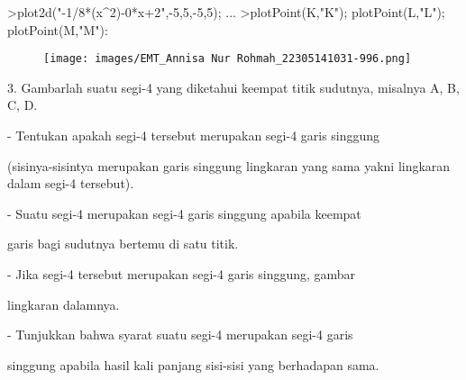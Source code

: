 \documentclass[a4paper,10pt]{article}
\begin{document}
\begin{eulernotebook}
\begin{eulercomment}
\begin{eulercomment}
\begin{eulercomment}
\begin{eulercomment}
\begin{euleroutput}
\end{euleroutput}
\begin{eulerprompt}
>plot2d("-1/8*(x^2)-0*x+2",-5,5,-5,5); ...
>plotPoint(K,"K"); plotPoint(L,"L"); plotPoint(M,"M"): 
\end{eulerprompt}
\begin{figure}[h]
    \centering
    \texttt{[image: images/EMT\_Annisa Nur Rohmah\_22305141031-996.png]}
\end{figure}
\begin{eulercomment}
3. Gambarlah suatu segi-4 yang diketahui keempat titik sudutnya,
misalnya A, B, C, D.\\
\end{eulercomment}
\begin{eulerttcomment}
   - Tentukan apakah segi-4 tersebut merupakan segi-4 garis singgung
\end{eulerttcomment}
\begin{eulercomment}
(sisinya-sisintya merupakan garis singgung lingkaran yang sama yakni
lingkaran dalam segi-4 tersebut).\\
\end{eulercomment}
\begin{eulerttcomment}
   - Suatu segi-4 merupakan segi-4 garis singgung apabila keempat
\end{eulerttcomment}
\begin{eulercomment}
garis bagi sudutnya bertemu di satu titik.\\
\end{eulercomment}
\begin{eulerttcomment}
   - Jika segi-4 tersebut merupakan segi-4 garis singgung, gambar
\end{eulerttcomment}
\begin{eulercomment}
lingkaran dalamnya.\\
\end{eulercomment}
\begin{eulerttcomment}
   - Tunjukkan bahwa syarat suatu segi-4 merupakan segi-4 garis
\end{eulerttcomment}
\begin{eulercomment}
singgung apabila hasil kali panjang sisi-sisi yang berhadapan sama.


\end{eulercomment}
\end{eulercomment}
\end{eulercomment}
\end{eulercomment}
\end{eulercomment}
\end{eulernotebook}
\end{document}
